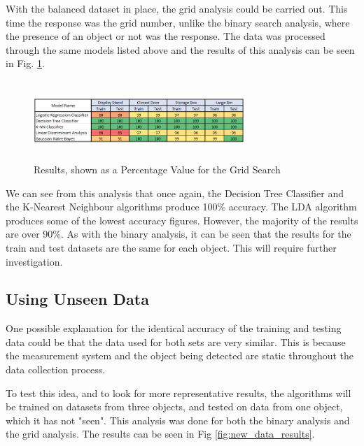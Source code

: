 \documentclass{svproc}
\begin{document}
With the balanced dataset in place, the grid analysis could be carried out. This time the response was the grid number, unlike the binary search 
analysis, where the presence of an object or not was the response. The data was processed through the same models listed above and the results 
of this analysis can be seen in Fig. \ref{fig:initial_analysis_gridsearch}.

\begin{figure}[ht]
\includegraphics[width=8cm, height=3cm]{images/initial_analysis_gridsearch.png}
\centering
\caption{Results, shown as a Percentage Value for the Grid Search}
\label{fig:initial_analysis_gridsearch}
\end{figure}

We can see from this analysis that once again, the Decision Tree Classifier and the K-Nearest Neighbour algorithms produce 100\% accuracy.  
The LDA algorithm produces some of the lowest accuracy figures. However, the majority of the results are over 90\%. As with the binary analysis, 
it can be seen that the results for the train and test datasets are the same for each object. This will require further investigation.

\subsection{Using Unseen Data}
One possible explanation for the identical accuracy of the training and testing data could be that the data used for both sets are very similar.
 This is because the measurement system and the object being detected are static throughout the data collection process. 

To test this idea, and to look for more representative results, the algorithms will be trained on datasets from three objects, and tested on 
data from one object, which it has not "seen". This analysis was done for both the binary analysis and the grid analysis. The results can be 
seen in Fig \ref{fig:new_data_results}.
\end{document}
